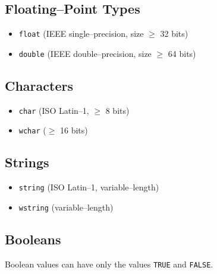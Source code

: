 \subsection{Floating--Point Types}

\begin{itemize}
  \item {\tt float} (IEEE single--precision, size $\geq$ 32 bits)
  \item {\tt double} (IEEE double--precision, size $\geq$ 64 bits)
\end{itemize}


\subsection{Characters}
\begin{itemize}
  \item {\tt char} (ISO Latin--1, $\geq$ 8 bits)
  \item {\tt wchar} ($\geq$ 16 bits)
\end{itemize}

\subsection{Strings}
\begin{itemize}
  \item {\tt string} (ISO Latin--1, variable--length)
  \item {\tt wstring} (variable--length)
\end{itemize}

\subsection{Booleans}
Boolean values can have only the values {\tt TRUE} and {\tt FALSE}. 

